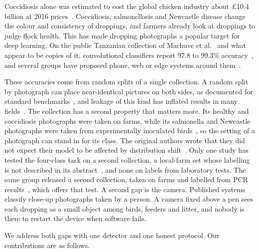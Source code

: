 \documentclass[10pt,twocolumn]{article}
\begin{document}
Coccidiosis alone was estimated to cost the global chicken industry about \pounds10.4 billion at 2016
prices~\cite{blake2020}. Coccidiosis, salmonellosis and Newcastle disease change the colour and consistency of
droppings, and farmers already look at droppings to judge flock health. This has made dropping photographs a popular
target for deep learning. On the public Tanzanian collection of Machuve et al.~\cite{machuve2022,machuve2021farm} and
what appear to be copies of it, convolutional classifiers report 97.8 to 99.3\%
accuracy~\cite{machuve2022,dhungana2025,degu2023,reyad2024,huda2024}, and several groups have proposed phone, web or
edge systems around them~\cite{degu2023,sakib2026,dhungana2025}.

These accuracies come from random splits of a single collection. A random split by photograph can place
near-identical pictures on both sides, as documented for standard benchmarks~\cite{barz2020}, and leakage of this
kind has inflated results in many fields~\cite{kapoor2023}. The collection has a second property that matters more.
Its healthy and coccidiosis photographs were taken on farms, while its salmonella and Newcastle photographs were taken
from experimentally inoculated birds~\cite{machuve2021farm}, so the setting of a photograph can stand in for its
class. The original authors wrote that they did not expect their model to be affected by distribution
shift~\cite{machuve2022}. Only one study has tested the four-class task on a second collection, a local-farm set
whose labelling is not described in its abstract~\cite{sakib2026}, and none on labels from laboratory tests. The same
group released a second collection, taken on farms and labelled from PCR results~\cite{machuve2021pcr}, which offers
that test. A second gap is the camera. Published systems classify close-up photographs taken by a person. A camera
fixed above a pen sees each dropping as a small object among birds, feeders and litter, and nobody is there to
restart the device when software fails.

We address both gaps with one detector and one honest protocol. Our contributions are as follows.
\end{document}
